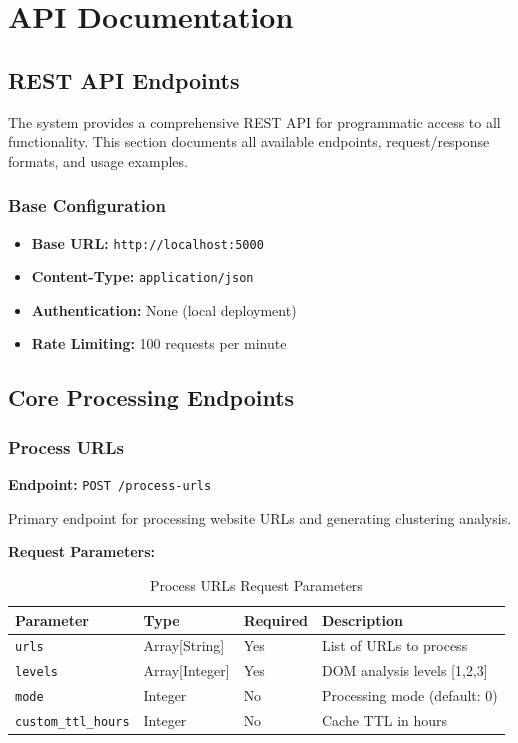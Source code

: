 \chapter{API Documentation}
\label{appendix:api-docs}

\section{REST API Endpoints}
\label{app:rest_api}

The {\name} system provides a comprehensive REST API for programmatic access to all functionality. This section documents all available endpoints, request/response formats, and usage examples.

\subsection{Base Configuration}

\begin{itemize}
\item \textbf{Base URL:} \texttt{http://localhost:5000}
\item \textbf{Content-Type:} \texttt{application/json}
\item \textbf{Authentication:} None (local deployment)
\item \textbf{Rate Limiting:} 100 requests per minute
\end{itemize}

\section{Core Processing Endpoints}
\label{app:core_endpoints}

\subsection{Process URLs}

\textbf{Endpoint:} \texttt{POST /process-urls}

Primary endpoint for processing website URLs and generating clustering analysis.

\textbf{Request Parameters:}

\begin{table}[h]
\centering
\caption{Process URLs Request Parameters}
\begin{tabular}{|l|l|l|l|}
\hline
\textbf{Parameter} & \textbf{Type} & \textbf{Required} & \textbf{Description} \\
\hline
\texttt{urls} & Array[String] & Yes & List of URLs to process \\
\texttt{levels} & Array[Integer] & Yes & DOM analysis levels [1,2,3] \\
\texttt{mode} & Integer & No & Processing mode (default: 0) \\
\texttt{custom\_ttl\_hours} & Integer & No & Cache TTL in hours \\
\hline
\end{tabular}
\end{table}


